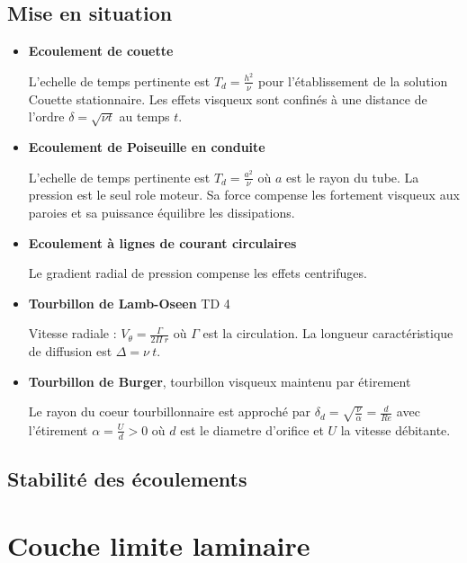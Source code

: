 \documentclass[french]{article}
\theoremstyle{definition}
\begin{document}
\subsection{Mise en situation}

\begin{itemize}
	\item \textbf{Ecoulement de couette}

	L'echelle de temps pertinente est $ T_d = \frac{h^2}{\nu} $ pour l'établissement de la solution Couette stationnaire. Les effets visqueux sont confinés à une distance de l'ordre $\delta = \sqrt{\nu t}$ au temps $t$.
	
	\item \textbf{Ecoulement de Poiseuille en conduite}
	
	L'echelle de temps pertinente est $ T_d = \frac{a^2}{\nu} $ où $a$ est le rayon du tube. La pression est le seul role moteur. Sa force compense les fortement visqueux aux paroies et sa puissance équilibre les dissipations.

	\item \textbf{Ecoulement à lignes de courant circulaires}
	
	Le gradient radial de pression compense les effets centrifuges.

	\item \textbf{Tourbillon de Lamb-Oseen} TD 4
	
	Vitesse radiale : $ V_{\theta} = \frac{\Gamma}{2 \Pi \ r} $ où $\Gamma$ est la circulation. La longueur caractéristique de diffusion est $\Delta = \nu \ t$.

	\item \textbf{Tourbillon de Burger}, tourbillon visqueux maintenu par étirement
	
	Le rayon du coeur tourbillonnaire est approché par $ \delta_d = \sqrt{\frac{\nu}{\alpha}} = \frac{d}{Re}$ 
	avec l'étirement $\alpha = \frac{U}{d} > 0$ où $d$ est le diametre d'orifice et $U$ la vitesse débitante.

\end{itemize}

\subsection{Stabilité des écoulements}

\section{Couche limite laminaire}
\end{document}

